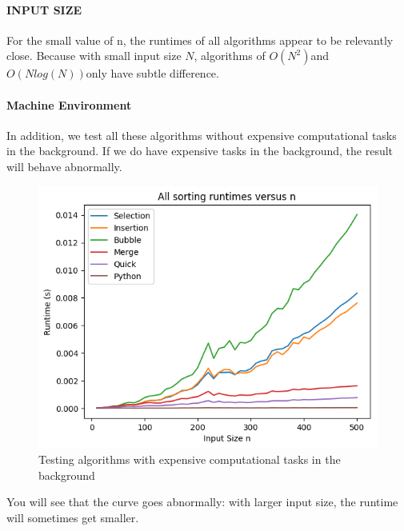 \documentclass{article}
\begin{document}
\paragraph{INPUT SIZE}
For the small value of n, the runtimes of all algorithms appear to be relevantly close. Because with small input size $N$, algorithms of $O(N^2)$and $O(Nlog(N)) $only have subtle difference.

\paragraph{Machine Environment}
In addition, we test all these algorithms without expensive computational tasks in the background. If we do have expensive tasks in the background, the result will behave abnormally.
\begin{figure}[H]
\centering
	\includegraphics[width = \textwidth]{../results/background}
	\caption{Testing algorithms with expensive computational tasks in the background}
\end{figure}
You will see that the curve goes abnormally: with larger input size, the runtime will sometimes get smaller.
\end{document}
